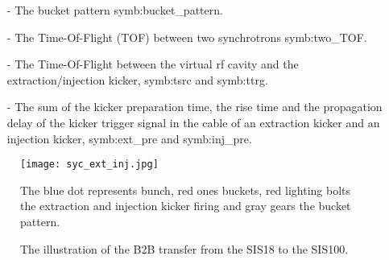 \begin{itemize}
\item[-] The bucket pattern \gls{symb:bucket_pattern}.
\item[-] The Time-Of-Flight (\gls{TOF}) between two synchrotrons \gls{symb:two_TOF}. 
\item[-] The Time-Of-Flight between the virtual rf cavity and the extraction/injection kicker, \gls{symb:tsrc} and \gls{symb:ttrg}. 
\item[-] The sum of the kicker preparation time, the rise time and the propagation delay of the kicker trigger signal in the cable of an extraction kicker and an injection kicker, \gls{symb:ext_pre} and \gls{symb:inj_pre}.
\end{itemize}
\begin{figure}[!htb]
   \centering   
   \texttt{[image: syc\_ext\_inj.jpg]}
   \caption{The illustration of the B2B transfer from the SIS18 to the SIS100.}{The blue dot represents bunch, red ones buckets, red lighting bolts the extraction and injection kicker firing and gray gears the bucket pattern.}
   \label{ext_inj_kicker}
\end{figure}
